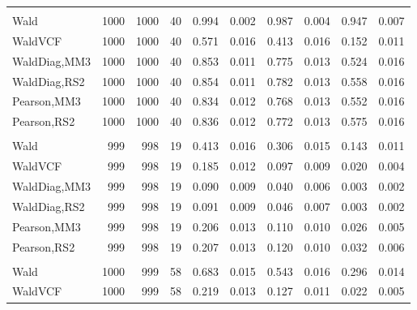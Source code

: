 \documentclass[
]{article}
\begin{document}
\begin{table}[H]
{\begin{tabular}[t]{lrrrrrrlrr}
\addlinespace[0.3em]
\multicolumn{10}{l}{\textbf{1F 15V}}\\
\hspace{1em}Wald & 1000 & 1000 & 40 & 0.994 & 0.002 & 0.987 & 0.004 & 0.947 & 0.007\\
\hspace{1em}WaldVCF & 1000 & 1000 & 40 & 0.571 & 0.016 & 0.413 & 0.016 & 0.152 & 0.011\\
\hspace{1em}WaldDiag,MM3 & 1000 & 1000 & 40 & 0.853 & 0.011 & 0.775 & 0.013 & 0.524 & 0.016\\
\hspace{1em}WaldDiag,RS2 & 1000 & 1000 & 40 & 0.854 & 0.011 & 0.782 & 0.013 & 0.558 & 0.016\\
\hspace{1em}Pearson,MM3 & 1000 & 1000 & 40 & 0.834 & 0.012 & 0.768 & 0.013 & 0.552 & 0.016\\
\hspace{1em}Pearson,RS2 & 1000 & 1000 & 40 & 0.836 & 0.012 & 0.772 & 0.013 & 0.575 & 0.016\\
\addlinespace[0.3em]
\multicolumn{10}{l}{\textbf{2F 10V}}\\
\hspace{1em}Wald & 999 & 998 & 19 & 0.413 & 0.016 & 0.306 & 0.015 & 0.143 & 0.011\\
\hspace{1em}WaldVCF & 999 & 998 & 19 & 0.185 & 0.012 & 0.097 & 0.009 & 0.020 & 0.004\\
\hspace{1em}WaldDiag,MM3 & 999 & 998 & 19 & 0.090 & 0.009 & 0.040 & 0.006 & 0.003 & 0.002\\
\hspace{1em}WaldDiag,RS2 & 999 & 998 & 19 & 0.091 & 0.009 & 0.046 & 0.007 & 0.003 & 0.002\\
\hspace{1em}Pearson,MM3 & 999 & 998 & 19 & 0.206 & 0.013 & 0.110 & 0.010 & 0.026 & 0.005\\
\hspace{1em}Pearson,RS2 & 999 & 998 & 19 & 0.207 & 0.013 & 0.120 & 0.010 & 0.032 & 0.006\\
\addlinespace[0.3em]
\multicolumn{10}{l}{\textbf{3F 15V}}\\
\hspace{1em}Wald & 1000 & 999 & 58 & 0.683 & 0.015 & 0.543 & 0.016 & 0.296 & 0.014\\
\hspace{1em}WaldVCF & 1000 & 999 & 58 & 0.219 & 0.013 & 0.127 & 0.011 & 0.022 & 0.005\\

\end{tabular}}
\end{table}
\end{document}
